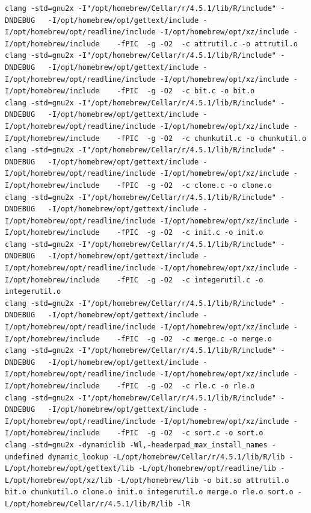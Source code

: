 \documentclass[
  11pt,
]{article}
\newenvironment{rpoutput}{\vspace{0.5em}\begin{snugshade}}{\end{snugshade}}
\begin{document}
\begin{rpoutput}

\begin{verbatim}
clang -std=gnu2x -I"/opt/homebrew/Cellar/r/4.5.1/lib/R/include" -DNDEBUG   -I/opt/homebrew/opt/gettext/include -I/opt/homebrew/opt/readline/include -I/opt/homebrew/opt/xz/include -I/opt/homebrew/include    -fPIC  -g -O2  -c attrutil.c -o attrutil.o
clang -std=gnu2x -I"/opt/homebrew/Cellar/r/4.5.1/lib/R/include" -DNDEBUG   -I/opt/homebrew/opt/gettext/include -I/opt/homebrew/opt/readline/include -I/opt/homebrew/opt/xz/include -I/opt/homebrew/include    -fPIC  -g -O2  -c bit.c -o bit.o
clang -std=gnu2x -I"/opt/homebrew/Cellar/r/4.5.1/lib/R/include" -DNDEBUG   -I/opt/homebrew/opt/gettext/include -I/opt/homebrew/opt/readline/include -I/opt/homebrew/opt/xz/include -I/opt/homebrew/include    -fPIC  -g -O2  -c chunkutil.c -o chunkutil.o
clang -std=gnu2x -I"/opt/homebrew/Cellar/r/4.5.1/lib/R/include" -DNDEBUG   -I/opt/homebrew/opt/gettext/include -I/opt/homebrew/opt/readline/include -I/opt/homebrew/opt/xz/include -I/opt/homebrew/include    -fPIC  -g -O2  -c clone.c -o clone.o
clang -std=gnu2x -I"/opt/homebrew/Cellar/r/4.5.1/lib/R/include" -DNDEBUG   -I/opt/homebrew/opt/gettext/include -I/opt/homebrew/opt/readline/include -I/opt/homebrew/opt/xz/include -I/opt/homebrew/include    -fPIC  -g -O2  -c init.c -o init.o
clang -std=gnu2x -I"/opt/homebrew/Cellar/r/4.5.1/lib/R/include" -DNDEBUG   -I/opt/homebrew/opt/gettext/include -I/opt/homebrew/opt/readline/include -I/opt/homebrew/opt/xz/include -I/opt/homebrew/include    -fPIC  -g -O2  -c integerutil.c -o integerutil.o
clang -std=gnu2x -I"/opt/homebrew/Cellar/r/4.5.1/lib/R/include" -DNDEBUG   -I/opt/homebrew/opt/gettext/include -I/opt/homebrew/opt/readline/include -I/opt/homebrew/opt/xz/include -I/opt/homebrew/include    -fPIC  -g -O2  -c merge.c -o merge.o
clang -std=gnu2x -I"/opt/homebrew/Cellar/r/4.5.1/lib/R/include" -DNDEBUG   -I/opt/homebrew/opt/gettext/include -I/opt/homebrew/opt/readline/include -I/opt/homebrew/opt/xz/include -I/opt/homebrew/include    -fPIC  -g -O2  -c rle.c -o rle.o
clang -std=gnu2x -I"/opt/homebrew/Cellar/r/4.5.1/lib/R/include" -DNDEBUG   -I/opt/homebrew/opt/gettext/include -I/opt/homebrew/opt/readline/include -I/opt/homebrew/opt/xz/include -I/opt/homebrew/include    -fPIC  -g -O2  -c sort.c -o sort.o
clang -std=gnu2x -dynamiclib -Wl,-headerpad_max_install_names -undefined dynamic_lookup -L/opt/homebrew/Cellar/r/4.5.1/lib/R/lib -L/opt/homebrew/opt/gettext/lib -L/opt/homebrew/opt/readline/lib -L/opt/homebrew/opt/xz/lib -L/opt/homebrew/lib -o bit.so attrutil.o bit.o chunkutil.o clone.o init.o integerutil.o merge.o rle.o sort.o -L/opt/homebrew/Cellar/r/4.5.1/lib/R/lib -lR

\end{verbatim}
\end{rpoutput}
\end{document}
